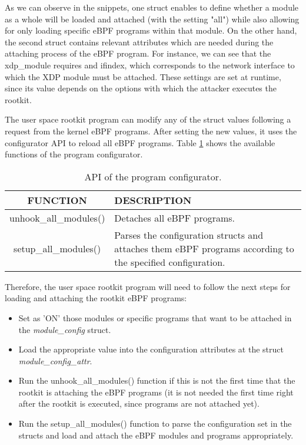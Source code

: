 As we can observe in the snippets, one struct enables to define whether a module as a whole will be loaded and attached (with the setting "all") while also allowing for only loading specific eBPF programs within that module. On the other hand, the second struct contains relevant attributes which are needed during the attaching process of the eBPF program. For instance, we can see that the xdp\_module requires and ifindex, which corresponds to the network interface to which the XDP module must be attached. These settings are set at runtime, since its value depends on the options with which the attacker executes the rootkit.

The user space rootkit program can modify any of the struct values following a request from the kernel eBPF programs. After setting the new values, it uses the configurator API to reload all eBPF programs. Table \ref{table:configurator_api} shows the available functions of the program configurator.

\begin{table}[htbp]
\begin{tabular}{|c|>{\centering\arraybackslash}p{10cm}|}
\hline
\textbf{FUNCTION} & \textbf{DESCRIPTION} \\
\hline
\hline
unhook\_all\_modules() & Detaches all eBPF programs.\\
\hline
setup\_all\_modules() & Parses the configuration structs and attaches them eBPF programs according to the specified configuration.\\
\hline
\end{tabular}
\caption{API of the program configurator.}
\label{table:configurator_api}
\end{table}

Therefore, the user space rootkit program will need to follow the next steps for loading and attaching the rootkit eBPF programs:
\begin{itemize}
\item Set as 'ON' those modules or specific programs that want to be attached in the \textit{module\_config} struct.
\item Load the appropriate value into the configuration attributes at the struct \textit{module\_config\_attr}.
\item Run the unhook\_all\_modules() function if this is not the first time that the rootkit is attaching the eBPF programs (it is not needed the first time right after the rootkit is executed, since programs are not attached yet).
\item Run the setup\_all\_modules() function to parse the configuration set in the structs and load and attach the eBPF modules and programs appropriately.
\end{itemize}

